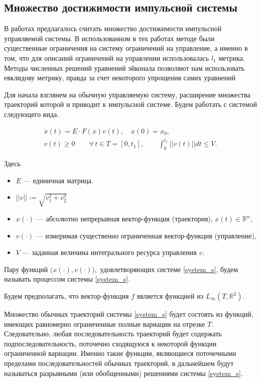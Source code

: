 \subsection{Множество достижимости импульсной системы}
\label{sec:ids}

В работах \cite{AVS2016, AV2015_1,AV2015_2} предлагалось считать
множество достижимости импульсной управляемой системы. В
использованном в тех работах методе были существенные ограничения на
систему ограничений на управление, а именно в том, что для описаний
ограничений на управлении использовалась $l_1$ метрика. Методы
численных решений уравнений эйконала позволяют нам использовать
евклидову метрику, правда за счет некоторого упрощения самих уравнений

Для начала взглянем на обычную управляемую систему, расширение
множества траекторий которой и приводит к импульсной системе. Будем
работать с системой следующего вида. 

\begin{equation}
  \label{system_s}
  \begin{array}{l}
    \dot{x}(t)=E \cdot F(x)v(t), \quad x(0)=x_0, \\[8pt]
    v(t)\geq 0  \qquad \forall\, t\in T = [0,t_1], \qquad
    \displaystyle\int_{0}^{t_1} ||v(t)||dt\leq V.
  \end{array} 
\end{equation}

Здесь
\begin{itemize}
  \item $E$ --- единичная матрица.
  \item $||v||:=\sqrt{v_1^2+v_2^2}$
  \item $x(\cdot)$ --- абсолютно непрерывная вектор-функция
    (траектория), $x(t)\in {\mathbb R}^n,$
  \item $v(\cdot)$ --- измеримая существенно ограниченная
    вектор-функция (управление),
  
  \item $V$ --- заданная величина интегрального ресурса управления
    $v$.
\end{itemize}

Пару функций $\bigl(x(\cdot),v(\cdot)\bigr),$ удовлетворяющих
системе \eqref{system_s}, будем называть процессом системы \eqref{system_s}.

Будем предполагать, что вектор-функция $f$ является функцией из
$L_{\infty}(T,\mathbb{R}^2)$.
     
Множество обычных траекторий системы \eqref{system_s} будет состоять
из функций, имеющих равномерно ограниченные полные вариации на отрезке
$T$. Следовательно, любая последовательность траекторий будет
содержать подпоследовательность, поточечно сходящуюся к некоторой
функции ограниченной вариации. Именно такие функции, являющиеся
поточечными пределами последовательностей обычных траекторий, в
дальнейшем будут называться разрывными (или обобщенными) решениями
системы \eqref{system_s}.

